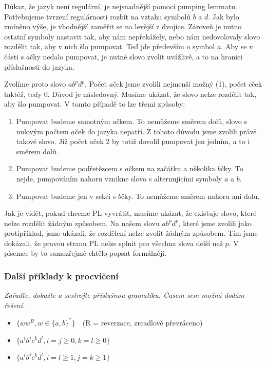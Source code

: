 \documentclass{article}
\begin{document}
Důkaz, že jazyk není regulární, je nejsnadnější pomocí pumping lemmatu.
Potřebujeme tvrzení regulárnosti rozbít na vztahu symbolů $b$ a $d$.
Jak bylo zmíněno výše, je vhodnější zaměřit se na levější z dvojice.
Zároveň je nutno ostatní symboly nastavit tak, aby nám nepřekážely, nebo nám nedovolovaly slovo rozdělit tak, aby v nich šlo pumpovat.
Teď jde především o symbol $a$.
Aby se v části s $a$čky nedalo pumpovat, je nutné slovo zvolit uvážlivě, a to na hranici příslušnosti do jazyka.

Zvolíme proto slovo $ab^pd^p$. Počet $a$ček jsme zvolili nejmenší možný (1), počet $c$ček taktéž, tedy 0. Důvod je následovný. 
Musíme ukázat, že slovo nelze rozdělit tak, aby šlo pumpovat. V tomto případě to lze třemi způsoby:

\begin{enumerate}
\item Pumpovat budeme samotným $a$čkem. To nemůžeme směrem dolů, slovo s nulovým počtem $a$ček do jazyka nepatří. Z tohoto důvodu jsme zvolili právě takové slovo. Již počet $a$ček 2 by totiž dovolil pumpovat jen jedním, a to i směrem dolů.
\item Pumpovat budeme podřetězcem s $a$čkem na začátku a několika $b$čky. To nejde, pumpováním nahoru vznikne slovo s alternujícími symboly $a$ a $b$.
\item Pumpovat budeme jen v sekci s $b$čky. To nemůžeme směrem nahoru ani dolů.
\end{enumerate}

Jak je vidět, pokud chceme PL vyvrátit, musíme ukázat, že existuje slovo, které nelze rozdělit žádným způsobem.
Na našem slovu $ab^pd^p$, které jsme zvolili jako protipříklad, jsme ukázali, že rozdělení nelze zvolit žádným způsobem.
Tím jsme dokázali, že pravou stranu PL nelze splnit pro všechna slova delší než $p$.
V písemce by to samozřejmě chtělo popsat formálněji.

\subsubsection{Další příklady k procvičení}
\emph{Zařaďte, dokažte a sestrojte příslušnou gramatiku. Časem sem možná dodám řešení.}

\begin{itemize}
\item $\{ww^R, w \in \{a,b\}^*\}$~~(R = reverzace, zrcadlově převráceno)
\item $\{a^ib^jc^kd^l, i=j\geq0, k=l\geq0\}$
\item $\{a^ib^jc^kd^l, i=l\geq1, j=k\geq1\}$
\end{itemize}
\end{document}
